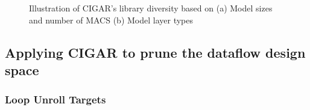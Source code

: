 \begin{figure}
    \centering
    \caption{Illustration of CIGAR's library diversity based on (a) Model sizes and number of MACS (b) Model layer types}
    \label{fig:cigar_library_overview}
\end{figure}

\clearpage

\subsection{Applying CIGAR to prune the dataflow design space}
\label{chap:dataflow_dse:pruning:applying_it}

\subsubsection{Loop Unroll Targets}
\label{chap:dataflow_dse:pruning:applying_it:loop_unroll_targets}


